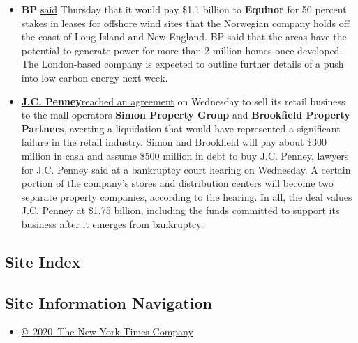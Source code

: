 \begin{itemize}
\item
  \textbf{BP}
  \href{https://www.bp.com/en/global/corporate/news-and-insights/press-releases/bp-and-equinor-form-strategic-partnership-to-develop-offshore-wind-energy-in-us.html}{said}
  Thursday that it would pay \$1.1 billion to \textbf{Equinor} for 50
  percent stakes in leases for offshore wind sites that the Norwegian
  company holds off the coast of Long Island and New England. BP said
  that the areas have the potential to generate power for more than 2
  million homes once developed. The London-based company is expected to
  outline further details of a push into low carbon energy next week.
\item
  \textbf{\href{https://www.nytimes3xbfgragh.onion/live/2020/09/09/business/stock-market-today-coronavirus/jc-penney-avoids-liquidation-in-a-sale-to-two-mall-operators}{J.C.
  Penney}}\href{https://www.nytimes3xbfgragh.onion/live/2020/09/09/business/stock-market-today-coronavirus/jc-penney-avoids-liquidation-in-a-sale-to-two-mall-operators}{reached
  an agreement} on Wednesday to sell its retail business to the mall
  operators \textbf{Simon Property Group} and \textbf{Brookfield
  Property Partners}, averting a liquidation that would have represented
  a significant failure in the retail industry. Simon and Brookfield
  will pay about \$300 million in cash and assume \$500 million in debt
  to buy J.C. Penney, lawyers for J.C. Penney said at a bankruptcy court
  hearing on Wednesday. A certain portion of the company's stores and
  distribution centers will become two separate property companies,
  according to the hearing. In all, the deal values J.C. Penney at
  \$1.75 billion, including the funds committed to support its business
  after it emerges from bankruptcy.
\end{itemize}

\hypertarget{site-index}{%
\subsection{Site Index}\label{site-index}}

\hypertarget{site-information-navigation}{%
\subsection{Site Information
Navigation}\label{site-information-navigation}}

\begin{itemize}
\tightlist
\item
  \href{https://help.nytimes3xbfgragh.onion/hc/en-us/articles/115014792127-Copyright-notice}{©~2020~The
  New York Times Company}
\end{itemize}

